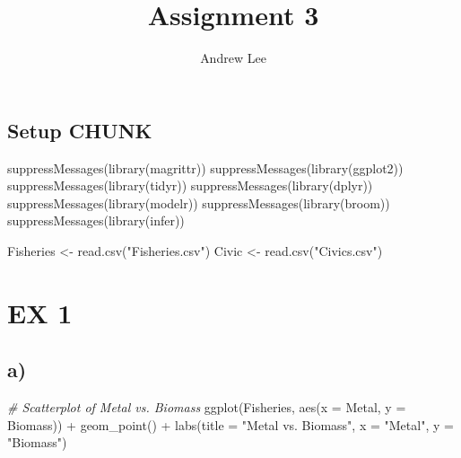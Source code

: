 \documentclass[
]{article}
\title{Assignment 3}
\author{Andrew Lee}
\date{}
\newenvironment{Shaded}{\begin{snugshade}}{\end{snugshade}}
\newcommand{\AttributeTok}[1]{\textcolor[rgb]{0.77,0.63,0.00}{#1}}
\newcommand{\CommentTok}[1]{\textcolor[rgb]{0.56,0.35,0.01}{\textit{#1}}}
\newcommand{\FunctionTok}[1]{\textcolor[rgb]{0.00,0.00,0.00}{#1}}
\newcommand{\NormalTok}[1]{#1}
\newcommand{\OtherTok}[1]{\textcolor[rgb]{0.56,0.35,0.01}{#1}}
\newcommand{\SpecialCharTok}[1]{\textcolor[rgb]{0.00,0.00,0.00}{#1}}
\newcommand{\StringTok}[1]{\textcolor[rgb]{0.31,0.60,0.02}{#1}}
\begin{document}
\maketitle

\hypertarget{setup-chunk}{%
\subsection{Setup CHUNK}\label{setup-chunk}}

\begin{Shaded}
\begin{Highlighting}[]
\FunctionTok{suppressMessages}\NormalTok{(}\FunctionTok{library}\NormalTok{(magrittr))}
\FunctionTok{suppressMessages}\NormalTok{(}\FunctionTok{library}\NormalTok{(ggplot2))}
\FunctionTok{suppressMessages}\NormalTok{(}\FunctionTok{library}\NormalTok{(tidyr))}
\FunctionTok{suppressMessages}\NormalTok{(}\FunctionTok{library}\NormalTok{(dplyr))}
\FunctionTok{suppressMessages}\NormalTok{(}\FunctionTok{library}\NormalTok{(modelr))}
\FunctionTok{suppressMessages}\NormalTok{(}\FunctionTok{library}\NormalTok{(broom))}
\FunctionTok{suppressMessages}\NormalTok{(}\FunctionTok{library}\NormalTok{(infer))}

\NormalTok{Fisheries }\OtherTok{\textless{}{-}} \FunctionTok{read.csv}\NormalTok{(}\StringTok{"Fisheries.csv"}\NormalTok{)}
\NormalTok{Civic }\OtherTok{\textless{}{-}} \FunctionTok{read.csv}\NormalTok{(}\StringTok{"Civics.csv"}\NormalTok{)}
\end{Highlighting}
\end{Shaded}

\hypertarget{ex-1}{%
\section{EX 1}\label{ex-1}}

\hypertarget{a}{%
\subsection{a)}\label{a}}

\begin{Shaded}
\begin{Highlighting}[]
\CommentTok{\# Scatterplot of Metal vs. Biomass}
\FunctionTok{ggplot}\NormalTok{(Fisheries, }\FunctionTok{aes}\NormalTok{(}\AttributeTok{x =}\NormalTok{ Metal, }\AttributeTok{y =}\NormalTok{ Biomass)) }\SpecialCharTok{+}
  \FunctionTok{geom\_point}\NormalTok{() }\SpecialCharTok{+}
  \FunctionTok{labs}\NormalTok{(}\AttributeTok{title =} \StringTok{"Metal vs. Biomass"}\NormalTok{, }\AttributeTok{x =} \StringTok{"Metal"}\NormalTok{, }\AttributeTok{y =} \StringTok{"Biomass"}\NormalTok{)}
\end{Highlighting}
\end{Shaded}
\end{document}
